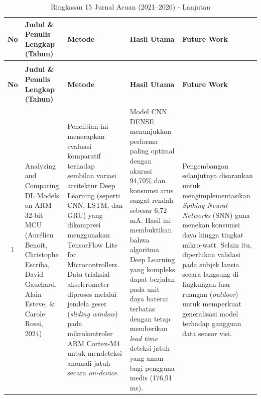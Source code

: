 \documentclass[12pt,a4paper]{article}
\begin{document}
\begin{small}
\begin{longtable}{|c|>{\raggedright\arraybackslash}p{3cm}|>{\raggedright\arraybackslash}p{4cm}|>{\raggedright\arraybackslash}p{4cm}|>{\raggedright\arraybackslash}p{4cm}|}
\caption{Ringkasan 15 Jurnal Acuan (2021--2026)} \label{tab:literatur} \\
\hline
\textbf{No} & \textbf{Judul \& Penulis Lengkap (Tahun)} & \textbf{Metode} & \textbf{Hasil Utama} & \textbf{Future Work} \\
\hline
\endfirsthead
\caption[]{Ringkasan 15 Jurnal Acuan (2021--2026) - Lanjutan} \\
\hline
\textbf{No} & \textbf{Judul \& Penulis Lengkap (Tahun)} & \textbf{Metode} & \textbf{Hasil Utama} & \textbf{Future Work} \\
\hline
\endhead
\hline
\endfoot

1 & Analyzing and Comparing DL Models on ARM 32-bit MCU (Aurélien Benoit, Christophe Escriba, David Gauchard, Alain Esteve, \& Carole Rossi, 2024) & Penelitian ini menerapkan evaluasi komparatif terhadap sembilan variasi arsitektur Deep Learning (seperti CNN, LSTM, dan GRU) yang dikompresi menggunakan TensorFlow Lite for Microcontrollers. Data triaksial akselerometer diproses melalui jendela geser (\textit{sliding window}) pada mikrokontroler ARM Cortex-M4 untuk mendeteksi anomali jatuh secara \textit{on-device}. & Model CNN DENSE menunjukkan performa paling optimal dengan akurasi 94,70\% dan konsumsi arus sangat rendah sebesar 6,72 mA. Hasil ini membuktikan bahwa algoritma Deep Learning yang kompleks dapat berjalan pada unit daya baterai terbatas dengan tetap memberikan \textit{lead time} deteksi jatuh yang aman bagi pengguna medis (176,91 ms). & Pengembangan selanjutnya disarankan untuk mengimplementasikan \textit{Spiking Neural Networks} (SNN) guna menekan konsumsi daya hingga tingkat mikro-watt. Selain itu, diperlukan validasi pada subjek lansia secara langsung di lingkungan luar ruangan (\textit{outdoor}) untuk memperkuat generalisasi model terhadap gangguan data sensor visi. \\ \hline


\end{longtable}
\end{small}
\end{document}
